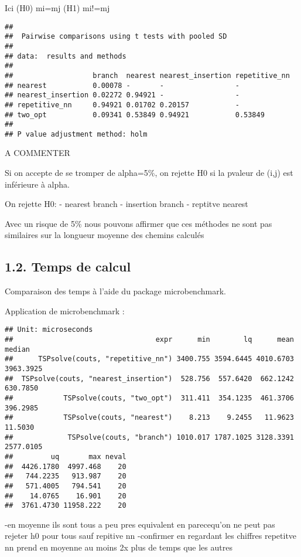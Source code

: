 \documentclass[]{article}
\begin{document}
Ici (H0) mi=mj (H1) mi!=mj

\begin{verbatim}
## 
##  Pairwise comparisons using t tests with pooled SD 
## 
## data:  results and methods 
## 
##                   branch  nearest nearest_insertion repetitive_nn
## nearest           0.00078 -       -                 -            
## nearest_insertion 0.02272 0.94921 -                 -            
## repetitive_nn     0.94921 0.01702 0.20157           -            
## two_opt           0.09341 0.53849 0.94921           0.53849      
## 
## P value adjustment method: holm
\end{verbatim}

A COMMENTER

Si on accepte de se tromper de alpha=5\%, on rejette H0 si la pvaleur de
(i,j) est inférieure à alpha.

On rejette H0: - nearest branch - insertion branch - reptitve nearest

Avec un risque de 5\% nous pouvons affirmer que ces méthodes ne sont pas
similaires sur la longueur moyenne des chemins calculés

\hypertarget{temps-de-calcul}{%
\subsection{1.2. Temps de calcul}\label{temps-de-calcul}}

Comparaison des temps à l'aide du package microbenchmark.

Application de microbenchmark :

\begin{verbatim}
## Unit: microseconds
##                                  expr      min        lq      mean    median
##      TSPsolve(couts, "repetitive_nn") 3400.755 3594.6445 4010.6703 3963.3925
##  TSPsolve(couts, "nearest_insertion")  528.756  557.6420  662.1242  630.7850
##            TSPsolve(couts, "two_opt")  311.411  354.1235  461.3706  396.2985
##            TSPsolve(couts, "nearest")    8.213    9.2455   11.9623   11.5030
##             TSPsolve(couts, "branch") 1010.017 1787.1025 3128.3391 2577.0105
##         uq       max neval
##  4426.1780  4997.468    20
##   744.2235   913.987    20
##   571.4005   794.541    20
##    14.0765    16.901    20
##  3761.4730 11958.222    20
\end{verbatim}

-en moyenne ils sont tous a peu pres equivalent en parecequ'on ne peut
pas rejeter h0 pour tous sauf repitive nn -confirmer en regardant les
chiffres repetitve nn prend en moyenne au moins 2x plus de temps que les
autres
\end{document}
